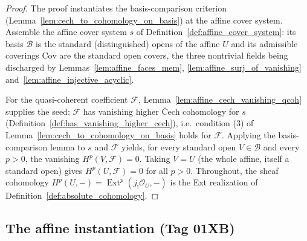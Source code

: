 \begin{proof}
  The proof instantiates the basis-comparison criterion
  (Lemma~\ref{lem:cech_to_cohomology_on_basis}) at the affine cover system. Assemble the affine cover
  system \(s\) of Definition~\ref{def:affine_cover_system}: its basis \(\mathcal{B}\) is the
  standard (distinguished) opens of the affine \(U\) and its admissible coverings \(\mathrm{Cov}\) are
  the standard open covers, the three nontrivial fields being discharged by
  Lemmas~\ref{lem:affine_faces_mem}, \ref{lem:affine_surj_of_vanishing}
  and~\ref{lem:affine_injective_acyclic}.

  For the quasi-coherent coefficient \(\mathcal{F}\), Lemma~\ref{lem:affine_cech_vanishing_qcoh}
  supplies the seed: \(\mathcal{F}\) has vanishing higher {\v C}ech cohomology for \(s\)
  (Definition~\ref{def:has_vanishing_higher_cech}), i.e.\ condition (3) of
  Lemma~\ref{lem:cech_to_cohomology_on_basis} holds for \(\mathcal{F}\). Applying the
  basis-comparison lemma to \(s\) and \(\mathcal{F}\) yields, for every standard open
  \(V \in \mathcal{B}\) and every \(p > 0\), the vanishing \(H^p(V, \mathcal{F}) = 0\). Taking
  \(V = U\) (the whole affine, itself a standard open) gives \(H^p(U, \mathcal{F}) = 0\) for all
  \(p > 0\). Throughout, the sheaf cohomology \(H^p(U, -) = \operatorname{Ext}^p(j_!\mathcal{O}_U, -)\)
  is the Ext realization of Definition~\ref{def:absolute_cohomology}.
\end{proof}

\subsection{The affine instantiation (Tag 01XB)}

